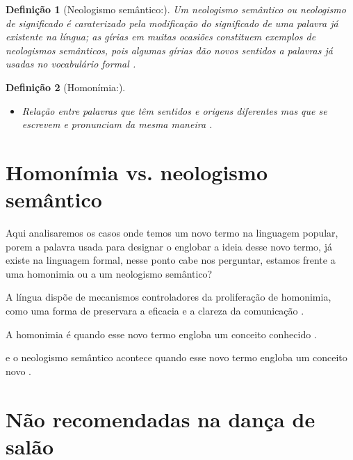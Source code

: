 \documentclass[a4paper,10pt]{article}
\newtheorem{mydefinition}{Definição}
\begin{document}
\begin{mydefinition}[Neologismo semântico:] 
\label{def:NeologismoSemantico}
Um neologismo semântico ou neologismo de significado é caraterizado pela modificação do significado de uma palavra já existente na língua;
as gírias em muitas ocasiões constituem exemplos de neologismos semânticos, 
pois algumas gírias dão novos sentidos a palavras já usadas no vocabulário formal \cite[pp. 82-83]{correalingua}.
\end{mydefinition}


\begin{mydefinition}[Homonímia:] 
\label{def:Homonimia}
~

\begin{itemize}
\item Relação entre palavras que têm sentidos e origens diferentes
 mas que se escrevem e pronunciam da mesma maneira \cite{priberamhomonimia}.

\end{itemize}
\end{mydefinition}

\section{Homonímia vs. neologismo semântico}
Aqui analisaremos os casos onde temos um novo termo na linguagem popular,
porem a palavra usada para designar o englobar a ideia desse novo termo,
já existe na linguagem formal, nesse ponto cabe nos perguntar, 
estamos frente a uma homonimia ou a um neologismo semântico?

A língua dispõe de mecanismos controladores da proliferação de homonimia,
como uma forma de preservara a eficacia e a clareza da comunicação \cite[pp. 13]{pilla2002neologismos}.

A homonimia é quando esse novo termo engloba um conceito conhecido \cite[pp. 13]{pilla2002neologismos}.

e o neologismo semântico acontece quando esse novo termo engloba um  conceito novo \cite[pp. 13]{pilla2002neologismos}.

\section{Não recomendadas na dança de salão}
\end{document}
